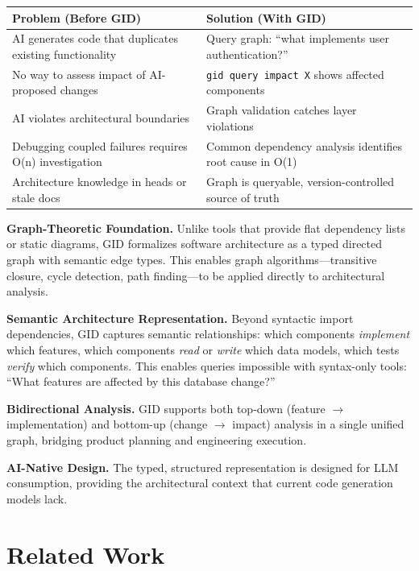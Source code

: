 \documentclass[11pt,a4paper]{article}
\begin{document}
\begin{table}[h]
\centering
\small
\begin{tabular}{@{}p{5.5cm}p{6.5cm}@{}}
\toprule
\textbf{Problem (Before GID)} & \textbf{Solution (With GID)} \\
\midrule
AI generates code that duplicates existing functionality & Query graph: ``what implements user authentication?'' \\
No way to assess impact of AI-proposed changes & \texttt{gid query impact X} shows affected components \\
AI violates architectural boundaries & Graph validation catches layer violations \\
Debugging coupled failures requires O(n) investigation & Common dependency analysis identifies root cause in O(1) \\
Architecture knowledge in heads or stale docs & Graph is queryable, version-controlled source of truth \\
\bottomrule
\end{tabular}
\end{table}

\textbf{Graph-Theoretic Foundation.} Unlike tools that provide flat dependency lists or static diagrams, GID formalizes software architecture as a typed directed graph with semantic edge types. This enables graph algorithms---transitive closure, cycle detection, path finding---to be applied directly to architectural analysis.

\textbf{Semantic Architecture Representation.} Beyond syntactic import dependencies, GID captures semantic relationships: which components \emph{implement} which features, which components \emph{read} or \emph{write} which data models, which tests \emph{verify} which components. This enables queries impossible with syntax-only tools: ``What features are affected by this database change?''

\textbf{Bidirectional Analysis.} GID supports both top-down (feature $\rightarrow$ implementation) and bottom-up (change $\rightarrow$ impact) analysis in a single unified graph, bridging product planning and engineering execution.

\textbf{AI-Native Design.} The typed, structured representation is designed for LLM consumption, providing the architectural context that current code generation models lack.

\section{Related Work}
\end{document}
